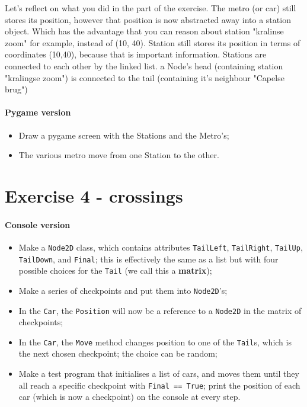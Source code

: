 \documentclass[12pt,a4paper]{article}
\begin{document}
		    Let's reflect on what you did in the part of the exercise. The metro (or car) still stores its position, however that position is now abstracted away into a station object. Which has the advantage that you can reason about station "kralinse zoom" for example, instead of (10, 40).
		    Station still stores its position in terms of coordinates (10,40), because that is important information.
		    Stations are connected to each other by the linked list. a Node's head (containing station "kralingse zoom") is connected to the tail (containing it's neighbour "Capelse brug")

		\paragraph*{Pygame version}
			\begin{itemize}
				\item Draw a pygame screen with the Stations and the Metro's;
				\item The various metro move from one Station to the other.
			\end{itemize}

	\section{Exercise 4 - crossings}
		\paragraph*{Console version}
			\begin{itemize}
				\item Make a \texttt{Node2D} class, which contains attributes \texttt{TailLeft}, \texttt{TailRight}, \texttt{TailUp}, \texttt{TailDown}, and \texttt{Final}; this is effectively the same as a list but with four possible choices for the \texttt{Tail} (we call this a \textbf{matrix});
				\item Make a series of checkpoints and put them into \texttt{Node2D}'s;
				\item In the \texttt{Car}, the \texttt{Position} will now be a reference to a \texttt{Node2D} in the matrix of checkpoints;
				\item In the \texttt{Car}, the \texttt{Move} method changes position to one of the \texttt{Tail}s, which is the next chosen checkpoint; the choice can be random;
				\item Make a test program that initialises a list of cars, and moves them until they all reach a specific checkpoint with \texttt{Final == True}; print the position of each car (which is now a checkpoint) on the console at every step.
			\end{itemize}
			
\end{document}
